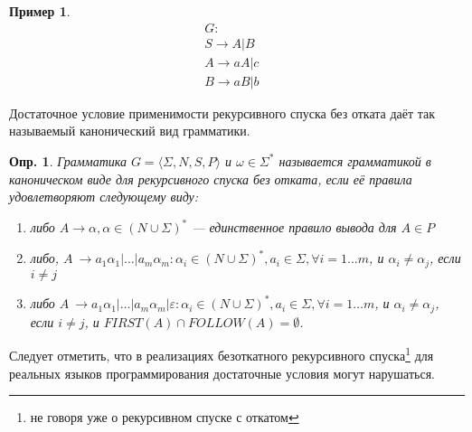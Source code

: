 \documentclass[10pt]{article}         %
\newtheorem{definition}{Опр.}
\newtheorem{example}{Пример}
\begin{document}
	\begin{example}
		\begin{align*}
			G: & \\
			S \to A|B & \\
			A \to aA|c & \\
			B \to aB|b
		\end{align*}
		
		
	\end{example}
	
	
	Достаточное условие применимости рекурсивного спуска без отката даёт так называемый канонический вид грамматики.
	
	\begin{definition}
		Грамматика $G = \langle \Sigma, N, S, P \rangle$ и $\omega \in \Sigma^{*}$ называется грамматикой в каноническом виде для рекурсивного спуска без отката, если её правила удовлетворяют следующему виду:
		\begin{enumerate}
			\item либо $A\to \alpha, \alpha \in (N\cup{\Sigma})^*$ --- единственное правило вывода для $A \in P$ 
			\item либо, $A\ \to a_1\alpha_1|\dots|a_m\alpha_m: \alpha_i \in (N\cup{\Sigma})^* , a_i \in \Sigma,  \forall i=1\dots{m}$, и $\alpha_i \neq \alpha_j$, если $i \neq j$
			\item либо $A\ \to a_1\alpha_1|\dots|a_m\alpha_m|\varepsilon: \alpha_i \in (N\cup{\Sigma})^* , a_i \in \Sigma,  \forall i=1\dots{m}$, и $\alpha_i \neq \alpha_j$, если $i \neq j$, и $FIRST(A)\cap{FOLLOW(A)}=\emptyset$.
		\end{enumerate}
	\end{definition}
	
	Следует отметить, что в реализациях безоткатного рекурсивного спуска\footnote{не говоря уже о рекурсивном спуске с откатом} для реальных языков программирования достаточные условия могут нарушаться. 
	
	
\end{document}
